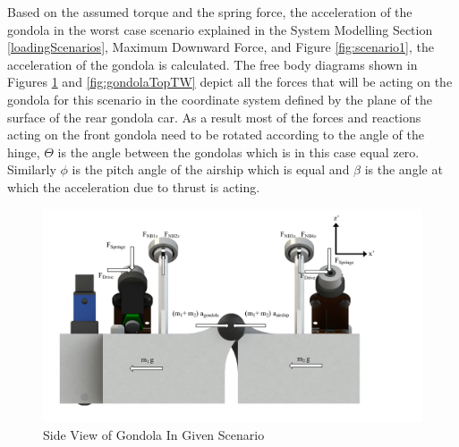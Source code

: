 \documentclass[../main.tex]{subfiles}
\begin{document}
Based on the assumed torque and the spring force, the acceleration of the gondola in the worst case scenario explained in the System Modelling Section \ref{loadingScenarios}, Maximum Downward Force, and Figure \ref{fig:scenario1}, the acceleration of the gondola is calculated. The free body diagrams shown in Figures \ref{fig:gondolaSideTW} and \ref{fig:gondolaTopTW} depict all the forces that will be acting on the gondola for this scenario in the coordinate system defined by the plane of the surface of the rear gondola car. As a result most of the forces and reactions acting on the front gondola need to be rotated according to the angle of the hinge, $\Theta$ is the angle between the gondolas which is in this case equal zero. Similarly $\phi$ is the pitch angle of the airship which is equal and $\beta$ is the angle at which the acceleration due to thrust is acting. 
\begin{figure}[H]
	\centering
	\includegraphics[width=1.1\linewidth]{img/gondola/gondolaSideTW.pdf}
	\caption{Side View of Gondola In Given Scenario}
	\label{fig:gondolaSideTW}
\end{figure}
\end{document}
